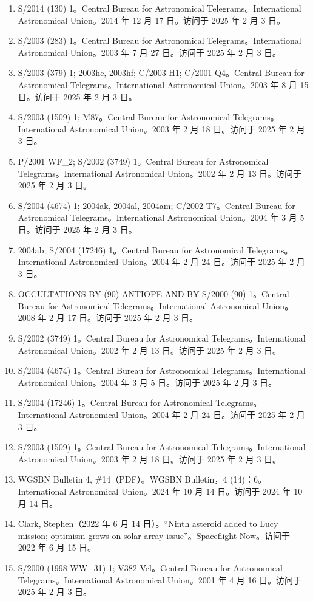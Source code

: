 \begin{enumerate}
\item S/2014 (130) 1。Central Bureau for Astronomical Telegrams。International Astronomical Union。2014 年 12 月 17 日。访问于 2025 年 2 月 3 日。
\item S/2003 (283) 1。Central Bureau for Astronomical Telegrams。International Astronomical Union。2003 年 7 月 27 日。访问于 2025 年 2 月 3 日。
\item S/2003 (379) 1; 2003he, 2003hf; C/2003 H1; C/2001 Q4。Central Bureau for Astronomical Telegrams。International Astronomical Union。2003 年 8 月 15 日。访问于 2025 年 2 月 3 日。
\item S/2003 (1509) 1; M87。Central Bureau for Astronomical Telegrams。International Astronomical Union。2003 年 2 月 18 日。访问于 2025 年 2 月 3 日。
\item P/2001 WF\_2; S/2002 (3749) 1。Central Bureau for Astronomical Telegrams。International Astronomical Union。2002 年 2 月 13 日。访问于 2025 年 2 月 3 日。
\item S/2004 (4674) 1; 2004ak, 2004al, 2004am; C/2002 T7。Central Bureau for Astronomical Telegrams。International Astronomical Union。2004 年 3 月 5 日。访问于 2025 年 2 月 3 日。
\item 2004ab; S/2004 (17246) 1。Central Bureau for Astronomical Telegrams。International Astronomical Union。2004 年 2 月 24 日。访问于 2025 年 2 月 3 日。
\item OCCULTATIONS BY (90) ANTIOPE AND BY S/2000 (90) 1。Central Bureau for Astronomical Telegrams。International Astronomical Union。2008 年 2 月 17 日。访问于 2025 年 2 月 3 日。
\item S/2002 (3749) 1。Central Bureau for Astronomical Telegrams。International Astronomical Union。2002 年 2 月 13 日。访问于 2025 年 2 月 3 日。
\item S/2004 (4674) 1。Central Bureau for Astronomical Telegrams。International Astronomical Union。2004 年 3 月 5 日。访问于 2025 年 2 月 3 日。
\item S/2004 (17246) 1。Central Bureau for Astronomical Telegrams。International Astronomical Union。2004 年 2 月 24 日。访问于 2025 年 2 月 3 日。
\item S/2003 (1509) 1。Central Bureau for Astronomical Telegrams。International Astronomical Union。2003 年 2 月 18 日。访问于 2025 年 2 月 3 日。
\item WGSBN Bulletin 4, \#14（PDF）。WGSBN Bulletin，4 (14)：6。International Astronomical Union。2024 年 10 月 14 日。访问于 2024 年 10 月 14 日。
\item Clark, Stephen（2022 年 6 月 14 日）。“Ninth asteroid added to Lucy mission; optimism grows on solar array issue”。Spaceflight Now。访问于 2022 年 6 月 15 日。
\item S/2000 (1998 WW\_31) 1; V382 Vel。Central Bureau for Astronomical Telegrams。International Astronomical Union。2001 年 4 月 16 日。访问于 2025 年 2 月 3 日。
\end{enumerate}
